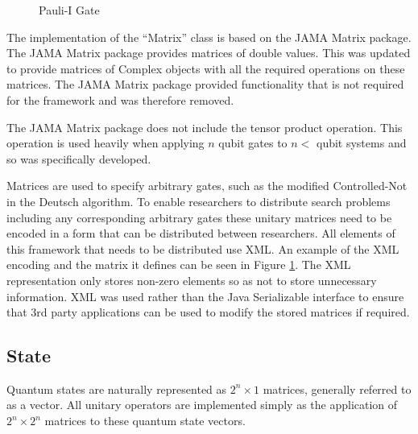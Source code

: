 \lstset{language = XML,
basicstyle=\footnotesize,
breakatwhitespace=false,
numbers=none,
breaklines=true}
\begin{figure}
\begin{center}
\hspace{20pt}
\end{center}
\caption{Pauli-I Gate}
\label{code:pauliixmldef}
\end{figure}

The implementation of the ``Matrix'' class is based on the JAMA Matrix package\cite{javamatrix}.
The JAMA Matrix package provides matrices of double values.
This was updated to provide matrices of Complex objects with all the required operations on these matrices.
The JAMA Matrix package provided functionality that is not required for the framework and was therefore removed.

The JAMA Matrix package does not include the tensor product operation.
This operation is used heavily when applying $n$ qubit gates to $n<$ qubit systems and so was specifically developed.

Matrices are used to specify arbitrary gates, such as the modified Controlled-Not in the Deutsch algorithm.
To enable researchers to distribute search problems including any corresponding arbitrary gates these unitary matrices need to be encoded in a form that can be distributed between researchers.
All elements of this framework that needs to be distributed use XML.
An example of the XML encoding and the matrix it defines can be seen in Figure \ref{code:pauliixmldef}.
The XML representation only stores non-zero elements so as not to store unnecessary information.
XML was used rather than the Java Serializable interface to ensure that 3rd party applications can be used to modify the stored matrices if required.

\subsection{State}
Quantum states are naturally represented as $2^n\times1$ matrices, generally referred to as a vector.
All unitary operators are implemented simply as the application of $2^n\times2^n$ matrices to these quantum state vectors.

